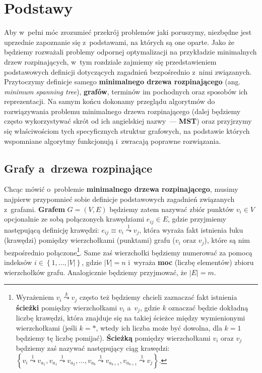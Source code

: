 \chapter{Podstawy}\label{ch:mst}
\thispagestyle{chapterBeginStyle}





Aby w~pełni móc zrozumieć przekrój problemów jaki poruszymy, niezbędne jest uprzednie zapoznanie się z~podstawami, na których są one oparte.
Jako że będziemy rozważali problemy odpornej optymalizacji na przykładzie minimalnych drzew rozpinających, w~tym rozdziale zajmiemy się przedstawieniem podstawowych definicji dotyczących zagadnień bezpośrednio z~nimi związanych.
Przytoczymy definicje samego \textbf{minimalnego drzewa rozpinającego} (ang. \textit{minimum spanning tree}), \textbf{grafów}, terminów im pochodnych oraz sposobów ich reprezentacji.
Na samym końcu dokonamy przeglądu algorytmów do rozwiązywania problemu minimalnego drzewa rozpinającego (dalej będziemy często wykorzystywać skrót od ich angielskiej nazwy~--- \textbf{MST}) oraz przyjrzymy się właściwościom tych specyficznych struktur grafowych, na podstawie których wspomniane algorytmy funkcjonują i~zwracają poprawne rozwiązania.




\section{Grafy a~drzewa rozpinające}




Chcąc mówić o~problemie \textbf{minimalnego drzewa rozpinającego}, musimy najpierw przypomnieć sobie definicje podstawowych zagadnień związanych z~grafami.
\textbf{Grafem} $G = \left( V, E \right)$ będziemy zatem nazywać zbiór punktów $v_{i} \in V$ opcjonalnie ze sobą połączonych krawędziami $e_{ij} \in E$, gdzie przyjmiemy następującą definicję krawędzi: $e_{ij} \equiv v_{i} \overset{1}{\leadsto} v_{j}$, która wyraża fakt istnienia łuku (krawędzi) pomiędzy wierzchołkami (punktami) grafu ($v_{i}$ oraz $v_{j}$), które są nim bezpośrednio połączone\footnote{
	Wyrażeniem $v_{i} \overset{k}{\leadsto} v_{j}$ często też będziemy chcieli zaznaczać fakt istnienia \textbf{ścieżki} pomiędzy wierzchołkami $v_{i}$ a~$v_{j}$, gdzie $k$ oznaczać będzie dokładną liczbę krawędzi, która znajduje się na takiej ścieżce między wymienionymi wierzchołkami (jeśli $k = \ast$, wtedy ich liczba może być dowolna, dla $k = 1$ będziemy tę liczbę pomijać). \textbf{Ścieżką} pomiędzy wierzchołkami $v_{i}$ oraz $v_{j}$ będziemy zaś nazywać następujący ciąg krawędzi: $\left\{ v_{i} \overset{1}{\leadsto} v_{a_{1}}, v_{a_{1}} \overset{1}{\leadsto} v_{a_{2}}, \dots, v_{a_{b}} \overset{1}{\leadsto} v_{a_{b+1}}, v_{a_{b+1}} \overset{1}{\leadsto} v_{j}  \right\}$.
}.
Same zaś wierzchołki będziemy numerować za pomocą indeksów $i \in \left\{ 1, \dots, \left| V \right| \right\}$, gdzie $\left| V \right| = n$ i~wyraża \textbf{moc} (liczbę elementów) zbioru wierzchołków grafu.
Analogicznie będziemy przyjmować, że $\left| E \right| = m$. 

